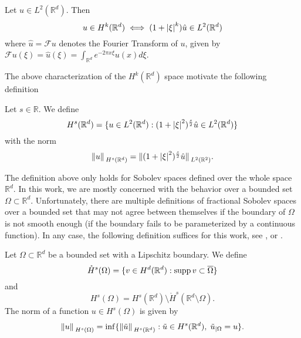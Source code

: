 \begin{lemma}
    Let \(u \in L^2(\mathbb{R}^d)\). Then
    \[
    u \in H^k(\mathbb{R}^d) \iff (1+ \abs{\xi}^k)\hat{u} \in L^2(\mathbb{R}^d)
    \]
    where \(\hat{u} = \mathcal{F}u\) denotes the Fourier Transform of \(u\), given by \(\mathcal{F}u(\xi) = \hat{u}(\xi) = \int_{\mathbb{R}^d} e^{-2 \pi x \xi} u(x) d\xi\).
\end{lemma}
The above characterization of the \(H^k(\mathbb{R}^d)\) space motivate the following definition
\begin{definition}
    Let \(s \in \mathbb{R}\). We define
    \[
    H^s(\mathbb{R}^d) = \{u \in L^2(\mathbb{R}^d): (1+ \abs{\xi}^2)^\frac{s}{2}\hat{u} \in L^2(\mathbb{R}^d)\} 
    \]
    with the norm
    \[
        \norm*{u}_{H^s(\mathbb{R}^d)} = \norm*{(1+ \abs{\xi}^2)^\frac{s}{2} \hat{u}}_{L^2(\mathbb{R}^2)}.
    \]
\end{definition}
The definition above only holds for Sobolev spaces defined over the whole space \(\mathbb{R}^d\). In this work, we are mostly concerned with the behavior over a bounded set \(\Omega \subset \mathbb{R}^d\). Unfortunately, there are multiple definitions of fractional Sobolev spaces over a bounded set that may not agree between themselves if the boundary of \(\Omega\) is not smooth enough (if the boundary fails to be parameterized by a continuous function). In any case, the following definition suffices for this work, see \cite{bogomolny1985fundamental}, \cite{chandler2017sobolev} or \cite{hewett2017note}.  
\begin{definition}
    Let \(\Omega \subset \mathbb{R}^d\) be a bounded set with a Lipschitz boundary. We define
    \[
        \mathring{H}^s(\Omega) = \{v \in H^d(\mathbb{R}^d): \operatorname{supp} v \subset \overline{\Omega}\}
    \]
    and
    \[
        H^s(\Omega) = H^s(\mathbb{R}^d)\setminus \mathring{H}^s(\mathbb{R}^d\setminus\Omega).
    \]
    The norm of a function \(u \in H^s(\Omega)\) is given by
    \[
        \norm*{u}_{H^s(\Omega)} = \inf \{\norm*{\Tilde{u}}_{H^s(\mathbb{R}^d)}: \Tilde{u} \in H^s(\mathbb{R}^d), \; \Tilde{u}_{|\Omega} = u\}.
    \]
\end{definition}

